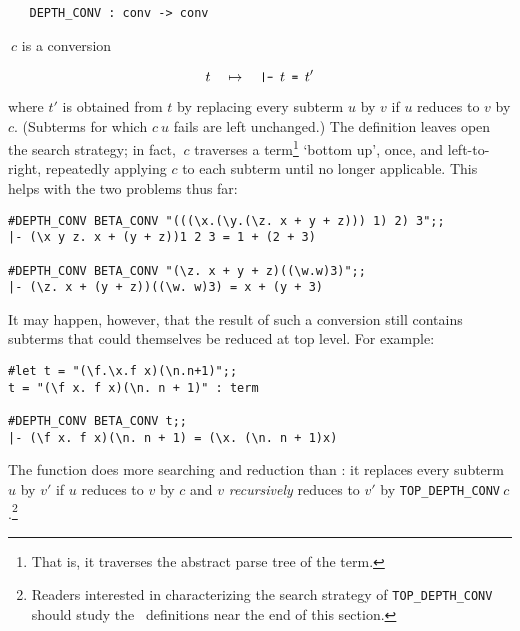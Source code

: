 \begin{boxed}
\begin{verbatim}
   DEPTH_CONV : conv -> conv
\end{verbatim}\end{boxed}

\noindent {}$\ c$ is a conversion

\[t\quad\mapsto\quad \ml{|- }t\ml{ = }t'\]

\noindent where $t'$ is obtained from $t$ by replacing every subterm
$u$ by $v$ if $u$ reduces to $v$ by $c$. (Subterms for which
$c\ u$ fails are left unchanged.) The definition leaves open the search strategy;
in fact,
$\ c$
 traverses a term\footnote{That is, it traverses
the abstract parse tree of the term.} `bottom up', once, and left-to-right,
repeatedly applying $c$ to each subterm until no longer applicable.
This helps with the two problems thus far:

\setcounter{sessioncount}{1}
\begin{session}\begin{verbatim}
#DEPTH_CONV BETA_CONV "(((\x.(\y.(\z. x + y + z))) 1) 2) 3";;
|- (\x y z. x + (y + z))1 2 3 = 1 + (2 + 3)

#DEPTH_CONV BETA_CONV "(\z. x + y + z)((\w.w)3)";;
|- (\z. x + (y + z))((\w. w)3) = x + (y + 3)
\end{verbatim}\end{session}

It may happen, however,
that the result of such a conversion still contains subterms
that could themselves be reduced at top level. For example:

\setcounter{sessioncount}{1}
\begin{session}\begin{verbatim}
#let t = "(\f.\x.f x)(\n.n+1)";;
t = "(\f x. f x)(\n. n + 1)" : term

#DEPTH_CONV BETA_CONV t;;
|- (\f x. f x)(\n. n + 1) = (\x. (\n. n + 1)x)
\end{verbatim}\end{session}

\noindent The function 
 does more
searching and reduction than
: it replaces
every subterm
$u$ by $v'$ if $u$ reduces to $v$ by $c$ and $v$ {\it recursively\/} reduces
to $v'$ by {\tt TOP\_DEPTH\_CONV}$\ c$.\footnote{Readers interested
in characterizing the search strategy of {\tt TOP\_DEPTH\_CONV} should
study the \ML\ definitions near the end of this section.}


